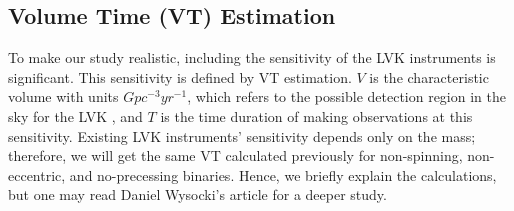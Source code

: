 \documentclass[twocolumn,prd,nofootinbib]{revtex4}
\begin{document}
 
        
    

\subsection{Volume Time (VT) Estimation}

To make our study realistic, including the sensitivity of the LVK instruments is significant. This sensitivity is defined by VT estimation. $V$ is the characteristic volume with units $Gpc^{-3}yr^{-1}$, which refers to the possible detection region in the sky for the LVK \cite{Volume_1993}, and $T$ is the time duration of making observations at this sensitivity.
Existing LVK instruments' sensitivity depends only on the mass; therefore, we will get the same VT calculated previously \cite{Dan_2019} for non-spinning, non-eccentric, and no-precessing binaries. Hence, we briefly explain the calculations, but one may read Daniel Wysocki's article \cite{Dan_2019} for a deeper study.
\end{document}
